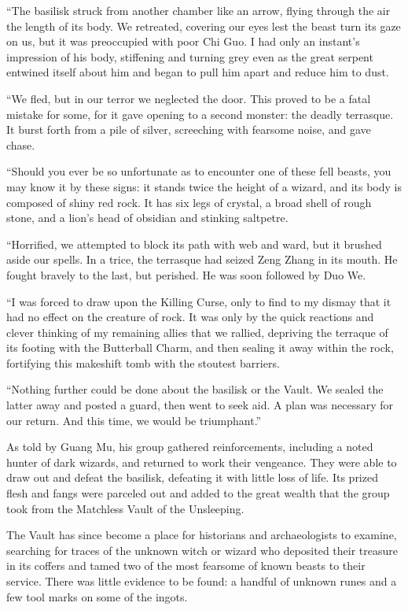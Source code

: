 ``The basilisk struck from another chamber like an arrow, flying through
the air the length of its body. We retreated, covering our eyes lest the
beast turn its gaze on us, but it was preoccupied with poor Chi Guo. I
had only an instant's impression of his body, stiffening and turning
grey even as the great serpent entwined itself about him and began to
pull him apart and reduce him to dust.

``We fled, but in our terror we neglected the door. This proved to be a
fatal mistake for some, for it gave opening to a second monster: the
deadly terrasque. It burst forth from a pile of silver, screeching with
fearsome noise, and gave chase.

``Should you ever be so unfortunate as to encounter one of these fell
beasts, you may know it by these signs: it stands twice the height of a
wizard, and its body is composed of shiny red rock. It has six legs of
crystal, a broad shell of rough stone, and a lion's head of obsidian and
stinking saltpetre.

``Horrified, we attempted to block its path with web and ward, but it
brushed aside our spells. In a trice, the terrasque had seized Zeng
Zhang in its mouth. He fought bravely to the last, but perished. He was
soon followed by Duo We.

``I was forced to draw upon the Killing Curse, only to find to my dismay
that it had no effect on the creature of rock. It was only by the quick
reactions and clever thinking of my remaining allies that we rallied,
depriving the terraque of its footing with the Butterball Charm, and
then sealing it away within the rock, fortifying this makeshift tomb
with the stoutest barriers.

``Nothing further could be done about the basilisk or the Vault. We
sealed the latter away and posted a guard, then went to seek aid. A plan
was necessary for our return. And this time, we would be triumphant.''

As told by Guang Mu, his group gathered reinforcements, including a
noted hunter of dark wizards, and returned to work their vengeance. They
were able to draw out and defeat the basilisk, defeating it with little
loss of life. Its prized flesh and fangs were parceled out and added to
the great wealth that the group took from the Matchless Vault of the
Unsleeping.

The Vault has since become a place for historians and archaeologists to
examine, searching for traces of the unknown witch or wizard who
deposited their treasure in its coffers and tamed two of the most
fearsome of known beasts to their service. There was little evidence to
be found: a handful of unknown runes and a few tool marks on some of the
ingots.

